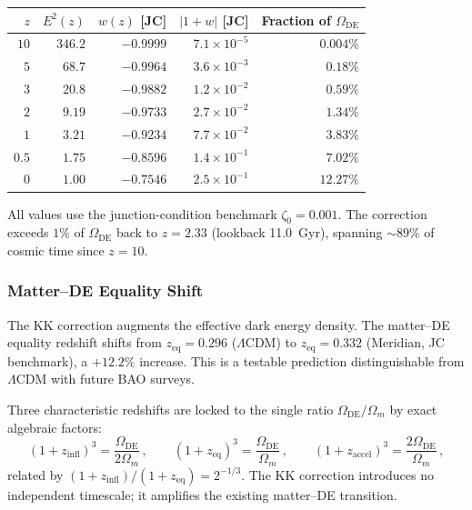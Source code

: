 \begin{center}
\small
\begin{tabular}{r r r r r}
\hline
$z$ & $E^2(z)$ & $w(z)$ [JC] & $|1+w|$ [JC] & Fraction of $\Omega_{\mathrm{DE}}$ \\
\hline
$10$ &  $346.2$  & $-0.9999$  & $7.1 \times 10^{-5}$ & $0.004\%$ \\
$5$  &  $68.7$   & $-0.9964$  & $3.6 \times 10^{-3}$ & $0.18\%$ \\
$3$  &  $20.8$   & $-0.9882$  & $1.2 \times 10^{-2}$ & $0.59\%$ \\
$2$  &  $9.19$   & $-0.9733$  & $2.7 \times 10^{-2}$ & $1.34\%$ \\
$1$  &  $3.21$   & $-0.9234$  & $7.7 \times 10^{-2}$ & $3.83\%$ \\
$0.5$ & $1.75$   & $-0.8596$  & $1.4 \times 10^{-1}$ & $7.02\%$ \\
$0$  &  $1.00$   & $-0.7546$  & $2.5 \times 10^{-1}$ & $12.27\%$ \\
\hline
\end{tabular}
\end{center}

\noindent
All values use the junction-condition benchmark $\zeta_0 = 0.001$. The correction exceeds $1\%$ of $\Omega_{\mathrm{DE}}$ back to $z = 2.33$ (lookback 11.0~Gyr), spanning ${\sim}89\%$ of cosmic time since $z = 10$.

\subsubsection{Matter--DE Equality Shift}

The KK correction augments the effective dark energy density. The matter--DE equality redshift shifts from $z_{\mathrm{eq}} = 0.296$ ($\Lambda$CDM) to $z_{\mathrm{eq}} = 0.332$ (Meridian, JC benchmark), a $+12.2\%$ increase. This is a testable prediction distinguishable from $\Lambda$CDM with future BAO surveys.

Three characteristic redshifts are locked to the single ratio $\Omega_{\mathrm{DE}}/\Omega_m$ by exact algebraic factors:
\begin{equation}
  (1 + z_{\mathrm{infl}})^3 = \frac{\Omega_{\mathrm{DE}}}{2\Omega_m}\,,\qquad
  (1 + z_{\mathrm{eq}})^3 = \frac{\Omega_{\mathrm{DE}}}{\Omega_m}\,,\qquad
  (1 + z_{\mathrm{accel}})^3 = \frac{2\Omega_{\mathrm{DE}}}{\Omega_m}\,,
  \label{eq:app-coinc-redshifts}
\end{equation}
related by $(1 + z_{\mathrm{infl}})/(1 + z_{\mathrm{eq}}) = 2^{-1/3}$. The KK correction introduces no independent timescale; it amplifies the existing matter--DE transition.

